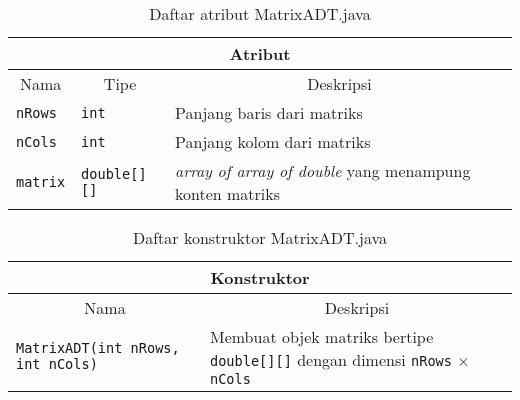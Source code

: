 \begin{table}[H]
    \centering
    \caption{Daftar atribut MatrixADT.java}
    \begin{tabular}{p{}|p{}|p{}}
        \hline
        \hline
        \multicolumn{3}{c}{\textbf{Atribut}}\\
        \hline
        \hline
         \multicolumn{1}{c|}{Nama} & \multicolumn{1}{c|}{Tipe} & \multicolumn{1}{c}{Deskripsi} \\
         \hline 
         \hline 
         \verb|nRows|  & \verb|int|         & Panjang baris dari matriks \\[.5em]
         \verb|nCols|  & \verb|int|         & Panjang kolom dari matriks \\[.5em]
         \verb|matrix| & \verb|double[][]|  & \textit{array of array of double} yang menampung konten matriks
    \end{tabular}
\end{table}

\begin{table}[H]
    \centering
    \caption{Daftar konstruktor MatrixADT.java}
    \begin{tabular}{p{}|p{}}
        \hline
        \hline
        \multicolumn{2}{c}{\textbf{Konstruktor}}\\
        \hline
        \hline
        \multicolumn{1}{c}{Nama} & \multicolumn{1}{|c}{Deskripsi} \\
         \hline 
         \hline 
        \texttt{MatrixADT(int nRows, int nCols)} & Membuat objek matriks bertipe \verb|double[][]| dengan dimensi \verb|nRows| $\times$ \verb|nCols| 
    \end{tabular}
\end{table}

